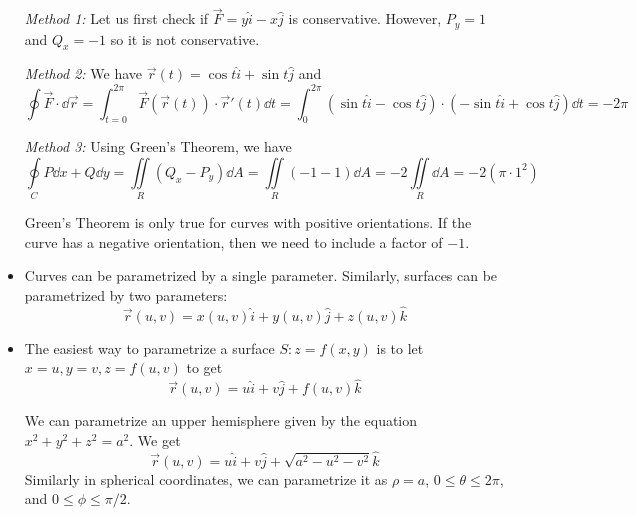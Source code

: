 \begin{itemize}
\begin{example}
        \textit{Method 1:} Let us first check if $\vec{F}=y\hat{i}-x\hat{j}$ is conservative. However, $P_y=1$ and $Q_x=-1$ so it is not conservative.
        \vspace{2mm}
        
        \textit{Method 2:} We have $\vec{r}(t)=\cos t\hat{i}+\sin t\hat{j}$ and 
        \begin{equation}
            \oint \vec{F}\cdot \dd{\vec{r}} = \int_{t=0}^{2\pi}\vec{F}(\vec{r}(t)) \cdot \vec{r}'(t) \dd{t} = \int_0^{2\pi} (\sin t\hat{i}-\cos t\hat{j})\cdot (-\sin t\hat{i}+\cos t\hat{j}) \dd{t} = -2\pi 
        \end{equation}
        \vspace{2mm}

        \textit{Method 3:} Using Green's Theorem, we have 
        \begin{equation}
            \oint\limits_C P\dd{x} + Q\dd{y} = \iint\limits_R (Q_x-P_y)\dd{A} = \iint\limits_R (-1-1) \dd{A} = -2\iint\limits_R\dd{A} = -2(\pi \cdot 1^2)
        \end{equation}
    \end{example}
    \begin{warning}
        Green's Theorem is only true for curves with positive orientations. If the curve has a negative orientation, then we need to include a factor of $-1$.
    \end{warning}
    \item Curves can be parametrized by a single parameter. Similarly, surfaces can be parametrized by two parameters: 
    \begin{equation}
        \vec{r}(u,v) = x(u,v)\hat{i} + y(u,v)\hat{j} + z(u,v)\hat{k}
    \end{equation}
    \item The easiest way to parametrize a surface $S:z=f(x,y)$ is to let $x=u,y=v,z=f(u,v)$ to get 
    \begin{equation}
        \vec{r}(u,v)=u\hat{i}+v\hat{j}+f(u,v)\hat{k}
    \end{equation}
    \begin{example}
        We can parametrize an upper hemisphere given by the equation $x^2+y^2+z^2=a^2$. We get 
        \begin{equation}
            \vec{r}(u,v) = u\hat{i}+v\hat{j} + \sqrt{a^2-u^2-v^2}\hat{k}
        \end{equation}
        Similarly in spherical coordinates, we can parametrize it as $\rho= a$, $0\le \theta \le 2\pi$, and $0\le \phi \le \pi/2$.

\end{example}
\end{itemize}
